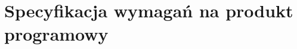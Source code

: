 \documentclass[../main.tex]{subfiles}
\begin{document}
\section{Specyfikacja wymagań na produkt programowy}
\end{document}
